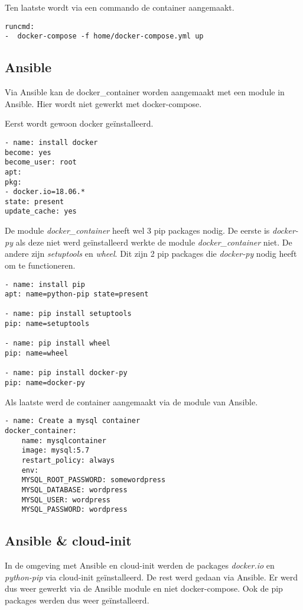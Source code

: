 Ten laatste wordt via een commando de container aangemaakt.
\begin{lstlisting}[basicstyle=\small]
runcmd:
-  docker-compose -f home/docker-compose.yml up
\end{lstlisting}

\subsection{Ansible}
Via Ansible kan de docker\_container worden aangemaakt met een module in Ansible. Hier wordt niet gewerkt met docker-compose.

Eerst wordt gewoon docker geïnstalleerd.
\begin{lstlisting}[basicstyle=\small]
- name: install docker
become: yes
become_user: root
apt:
pkg:
- docker.io=18.06.*
state: present
update_cache: yes
\end{lstlisting}

De module \textit{docker\_container} heeft wel 3 pip packages nodig. De eerste is \textit{docker-py} als deze niet werd geïnstalleerd werkte de module \textit{docker\_container} niet. De andere zijn \textit{setuptools} en \textit{wheel}. Dit zijn 2 pip packages die \textit{docker-py} nodig heeft om te functioneren.
\begin{lstlisting}[basicstyle=\small]
- name: install pip
apt: name=python-pip state=present

- name: pip install setuptools
pip: name=setuptools

- name: pip install wheel
pip: name=wheel

- name: pip install docker-py
pip: name=docker-py
\end{lstlisting}

Als laatste werd de container aangemaakt via de module van Ansible.
\begin{lstlisting}[basicstyle=\small]
- name: Create a mysql container
docker_container:
    name: mysqlcontainer
    image: mysql:5.7
    restart_policy: always
    env:
    MYSQL_ROOT_PASSWORD: somewordpress
    MYSQL_DATABASE: wordpress
    MYSQL_USER: wordpress
    MYSQL_PASSWORD: wordpress
\end{lstlisting}

\subsection{Ansible \& cloud-init}
In de omgeving met Ansible en cloud-init werden de packages \textit{docker.io} en \textit{python-pip} via cloud-init geïnstalleerd. De rest werd gedaan via Ansible. Er werd dus weer gewerkt via de Ansible module en niet docker-compose. Ook de pip packages werden dus weer geïnstalleerd.

